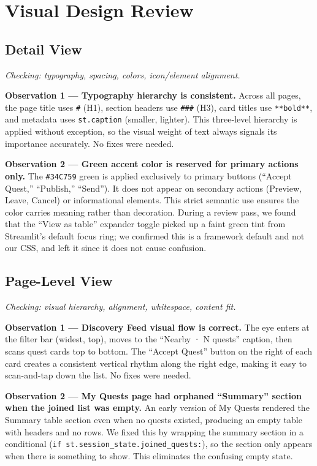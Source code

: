 \documentclass[11pt]{article}
\begin{document}
\section{Visual Design Review}

\subsection{Detail View}

\textit{Checking: typography, spacing, colors, icon/element alignment.}

\textbf{Observation 1 --- Typography hierarchy is consistent.}
Across all pages, the page title uses \texttt{\#} (H1), section headers use \texttt{\#\#\#} (H3), card titles use \texttt{**bold**}, and metadata uses \texttt{st.caption} (smaller, lighter). This three-level hierarchy is applied without exception, so the visual weight of text always signals its importance accurately. No fixes were needed.

\textbf{Observation 2 --- Green accent color is reserved for primary actions only.}
The \texttt{\#34C759} green is applied exclusively to primary buttons (``Accept Quest,'' ``Publish,'' ``Send''). It does not appear on secondary actions (Preview, Leave, Cancel) or informational elements. This strict semantic use ensures the color carries meaning rather than decoration. During a review pass, we found that the ``View as table'' expander toggle picked up a faint green tint from Streamlit's default focus ring; we confirmed this is a framework default and not our CSS, and left it since it does not cause confusion.

\subsection{Page-Level View}

\textit{Checking: visual hierarchy, alignment, whitespace, content fit.}

\textbf{Observation 1 --- Discovery Feed visual flow is correct.}
The eye enters at the filter bar (widest, top), moves to the ``Nearby · N quests'' caption, then scans quest cards top to bottom. The ``Accept Quest'' button on the right of each card creates a consistent vertical rhythm along the right edge, making it easy to scan-and-tap down the list. No fixes were needed.

\textbf{Observation 2 --- My Quests page had orphaned ``Summary'' section when the joined list was empty.}
An early version of My Quests rendered the Summary table section even when no quests existed, producing an empty table with headers and no rows. We fixed this by wrapping the summary section in a conditional (\texttt{if st.session\_state.joined\_quests:}), so the section only appears when there is something to show. This eliminates the confusing empty state.
\end{document}
